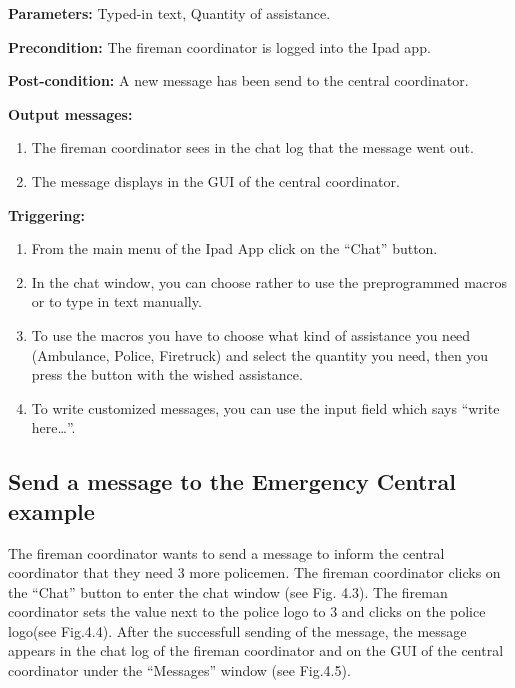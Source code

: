 \begin{description}

\item \textbf{Parameters:} Typed-in text, Quantity of assistance.
\item \textbf{Precondition:} The fireman coordinator is logged into the Ipad
app.
\item \textbf{Post-condition:} A new message has been send to the central
coordinator. 
\item \textbf{Output messages:}
\begin{enumerate}
  \item The fireman coordinator sees in the chat log that the message went out.
  \item The message displays in the GUI of the central coordinator.
\end{enumerate}

\item \textbf{Triggering:}
\begin{enumerate}
  \item From the main menu of the Ipad App click on the “Chat” button.
  \item In the chat window, you can choose rather to use the preprogrammed
  macros or to type in text manually.
  \item To use the macros you have to choose what kind of assistance you need
  (Ambulance, Police, Firetruck) and select the quantity you need, then you
  press the button with the wished assistance.
  \item To write customized messages, you can use the input field which says
  “write here\ldots”.
\end{enumerate}
\end{description}

 
\subsection{Send a message to the Emergency Central example}
The fireman coordinator wants to send a message to inform the central
coordinator that they need 3 more policemen. The fireman coordinator clicks on
the “Chat” button to enter the chat window (see Fig. 4.3). The fireman
coordinator sets the value next to the police logo to 3 and clicks on the
police logo(see Fig.4.4).
After the successfull sending of the message, the message
appears in the chat log of the fireman coordinator and on the GUI of the central
coordinator under the “Messages” window (see Fig.4.5).

